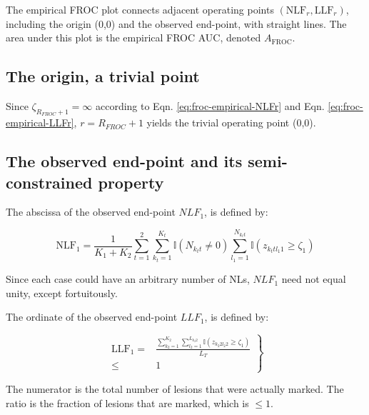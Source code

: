 \documentclass[
]{book}
\begin{document}
The empirical FROC plot connects adjacent operating points \(\left (\text{NLF}_r, \text{LLF}_r \right )\), including the origin (0,0) and the observed end-point, with straight lines. The area under this plot is the empirical FROC AUC, denoted \(A_{\text{FROC}}\).

\hypertarget{froc-empirical-origin-trivial-point}{%
\subsection{The origin, a trivial point}\label{froc-empirical-origin-trivial-point}}

Since \(\zeta_{R_{FROC}+1} = \infty\) according to Eqn. \eqref{eq:froc-empirical-NLFr} and Eqn. \eqref{eq:froc-empirical-LLFr}, \(r = R_{FROC}+1\) yields the trivial operating point (0,0).

\hypertarget{froc-empirical-end-point}{%
\subsection{The observed end-point and its semi-constrained property}\label{froc-empirical-end-point}}

The abscissa of the observed end-point \(NLF_1\), is defined by:

\begin{equation}
\text{NLF}_1 = \frac{1}{K_1+K_2} \sum_{t=1}^{2} \sum_{k_t=1}^{K_t} \mathbb{I} \left ( N_{k_t t} \neq 0 \right ) \sum_{l_1=1}^{N_{k_t t}} \mathbb{I} \left ( z_{k_t t l_1 1} \geq \zeta_1 \right ) 
\label{eq:froc-empirical-NLF11}
\end{equation}

Since each case could have an arbitrary number of NLs, \(NLF_1\) need not equal unity, except fortuitously.

The ordinate of the observed end-point \(LLF_1\), is defined by:

\begin{equation}
\left.
\begin{aligned}
\text{LLF}_1 =& \frac{ \sum_{k_2=1}^{K_2} \sum_{l_2=1}^{L_{k_2 2}} \mathbb{I} \left ( z_{k_2 2 l_2 2} \geq  \zeta_1  \right ) }{L_T}\\
\leq& 1
\end{aligned}
\right \}
\label{eq:froc-empirical-LLF1a}
\end{equation}

The numerator is the total number of lesions that were actually marked. The ratio is the fraction of lesions that are marked, which is \(\leq 1\).
\end{document}
